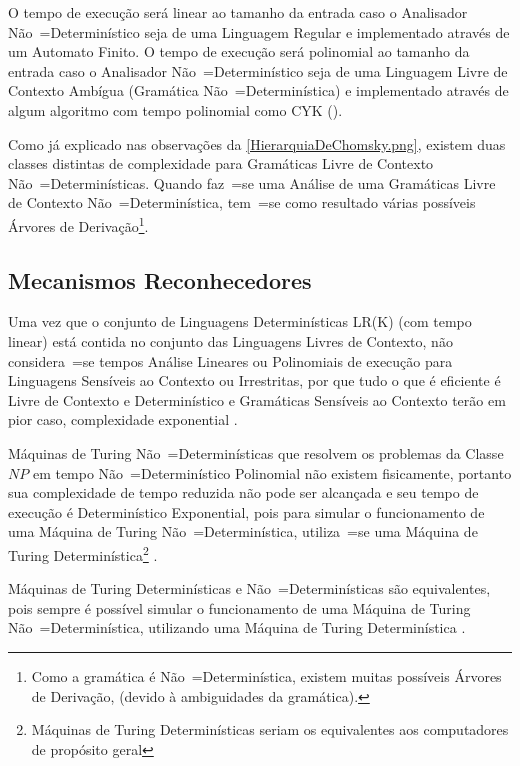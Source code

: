     O tempo de execução será linear ao tamanho da entrada caso o Analisador Não~=Determinístico seja de uma Linguagem Regular e
    implementado através de um Automato Finito.
    O tempo de execução será polinomial ao tamanho da entrada caso o Analisador Não~=Determinístico seja de uma Linguagem Livre de Contexto Ambígua (Gramática Não~=Determinística) e
    implementado através de algum algoritmo com tempo polinomial como CYK ().

    Como já explicado nas observações da \autoref{HierarquiaDeChomsky.png},
    existem duas classes distintas de complexidade para Gramáticas Livre de Contexto Não~=Determinísticas.
    Quando faz~=se uma Análise de uma Gramáticas Livre de Contexto Não~=Determinística,
    tem~=se como resultado várias possíveis Árvores de Derivação\footnote{
    Como a gramática é Não~=Determinística,
    existem muitas possíveis Árvores de Derivação,
    (devido à ambiguidades da gramática).
    }.


\subsection{Mecanismos Reconhecedores}
\label{mecanismosReconhecedores}

    Uma vez que o conjunto de Linguagens Determinísticas LR(K) (com tempo linear) está contida no conjunto das Linguagens Livres de Contexto,
    não considera~=se tempos Análise Lineares ou
    Polinomiais de execução para Linguagens Sensíveis ao Contexto ou
    Irrestritas,
    por que tudo o que é eficiente é Livre de Contexto e
    Determinístico e
    Gramáticas Sensíveis ao Contexto terão em pior caso,
    complexidade exponential \cite{growingContextSensitiveLanguages}.

    Máquinas de Turing Não~=Determinísticas que resolvem os problemas da Classe $NP$ em tempo Não~=Determinístico Polinomial não existem fisicamente,
    portanto sua complexidade de tempo reduzida não pode ser alcançada e
    seu tempo de execução é Determinístico Exponential,
    pois para simular o funcionamento de uma Máquina de Turing Não~=Determinística,
    utiliza~=se uma Máquina de Turing Determinística\footnote{
    Máquinas de Turing Determinísticas seriam os equivalentes aos computadores de propósito geral
    }
    \cite{sipserBook,turingMachinesRoyer}.

    Máquinas de Turing Determinísticas e
    Não~=Determinísticas são equivalentes,
    pois sempre é possível simular o funcionamento de uma Máquina de Turing Não~=Determinística,
    utilizando uma Máquina de Turing Determinística \cite{hopcroftBook}.

